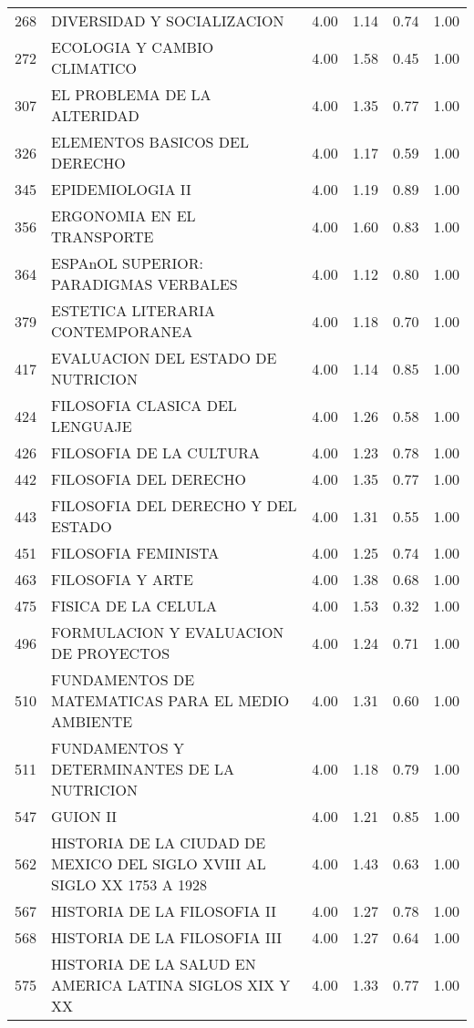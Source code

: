 \begin{table}[ht]
\begin{tabular}{rlrrrr}
  268 & DIVERSIDAD Y SOCIALIZACION & 4.00 & 1.14 & 0.74 & 1.00 \\ 
  272 & ECOLOGIA Y CAMBIO CLIMATICO & 4.00 & 1.58 & 0.45 & 1.00 \\ 
  307 & EL PROBLEMA DE LA ALTERIDAD & 4.00 & 1.35 & 0.77 & 1.00 \\ 
  326 & ELEMENTOS BASICOS DEL DERECHO & 4.00 & 1.17 & 0.59 & 1.00 \\ 
  345 & EPIDEMIOLOGIA II & 4.00 & 1.19 & 0.89 & 1.00 \\ 
  356 & ERGONOMIA EN EL TRANSPORTE & 4.00 & 1.60 & 0.83 & 1.00 \\ 
  364 & ESPAnOL SUPERIOR: PARADIGMAS VERBALES & 4.00 & 1.12 & 0.80 & 1.00 \\ 
  379 & ESTETICA LITERARIA CONTEMPORANEA & 4.00 & 1.18 & 0.70 & 1.00 \\ 
  417 & EVALUACION DEL ESTADO DE NUTRICION & 4.00 & 1.14 & 0.85 & 1.00 \\ 
  424 & FILOSOFIA CLASICA DEL LENGUAJE & 4.00 & 1.26 & 0.58 & 1.00 \\ 
  426 & FILOSOFIA DE LA CULTURA & 4.00 & 1.23 & 0.78 & 1.00 \\ 
  442 & FILOSOFIA DEL DERECHO & 4.00 & 1.35 & 0.77 & 1.00 \\ 
  443 & FILOSOFIA DEL DERECHO Y DEL ESTADO & 4.00 & 1.31 & 0.55 & 1.00 \\ 
  451 & FILOSOFIA FEMINISTA & 4.00 & 1.25 & 0.74 & 1.00 \\ 
  463 & FILOSOFIA Y ARTE & 4.00 & 1.38 & 0.68 & 1.00 \\ 
  475 & FISICA DE LA CELULA & 4.00 & 1.53 & 0.32 & 1.00 \\ 
  496 & FORMULACION Y EVALUACION DE PROYECTOS & 4.00 & 1.24 & 0.71 & 1.00 \\ 
  510 & FUNDAMENTOS DE MATEMATICAS PARA EL MEDIO AMBIENTE & 4.00 & 1.31 & 0.60 & 1.00 \\ 
  511 & FUNDAMENTOS Y DETERMINANTES DE LA NUTRICION & 4.00 & 1.18 & 0.79 & 1.00 \\ 
  547 & GUION II & 4.00 & 1.21 & 0.85 & 1.00 \\ 
  562 & HISTORIA DE LA CIUDAD DE MEXICO DEL SIGLO XVIII AL SIGLO XX 1753 A 1928 & 4.00 & 1.43 & 0.63 & 1.00 \\ 
  567 & HISTORIA DE LA FILOSOFIA II & 4.00 & 1.27 & 0.78 & 1.00 \\ 
  568 & HISTORIA DE LA FILOSOFIA III & 4.00 & 1.27 & 0.64 & 1.00 \\ 
  575 & HISTORIA DE LA SALUD EN AMERICA LATINA SIGLOS XIX Y XX & 4.00 & 1.33 & 0.77 & 1.00 \\ 

\end{tabular}
\end{table}
